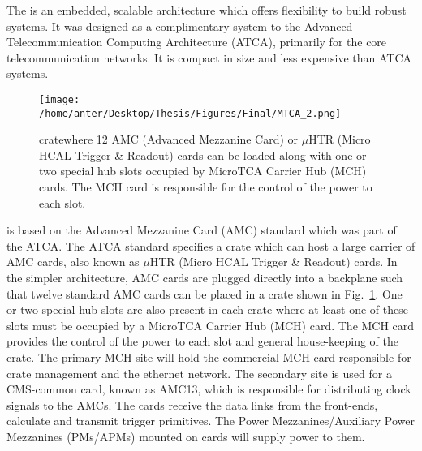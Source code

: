 The \mtca is an embedded, scalable architecture which offers flexibility to build robust systems. It was designed as a complimentary system to the Advanced Telecommunication Computing Architecture (ATCA), primarily for the core telecommunication networks. It is compact in size and less expensive than ATCA systems.\begin{figure}[!h]
\begin{center}
\vspace*{3mm}
\hspace*{-5mm}
\texttt{[image: /home/anter/Desktop/Thesis/Figures/Final/MTCA\_2.png]}\\
\vspace*{4mm}
\caption[\mtca crate showing the different slots.]{\mtca crate\footnotemark where 12 AMC (Advanced Mezzanine Card) or $\mu$HTR (Micro HCAL Trigger \& Readout) cards can be loaded along with one or two special hub slots occupied by MicroTCA Carrier Hub (MCH) cards. The MCH card is responsible for the control of the power to each slot.}
\label{fig:MTCA}
\end{center}
\end{figure} \mtca is based on the Advanced Mezzanine Card (AMC) standard which was part of the ATCA. The ATCA standard specifies a crate which can host a large carrier of AMC cards, also known as $\mu$HTR (Micro HCAL Trigger \& Readout) cards. In the simpler \mtca architecture, AMC cards are plugged directly into a backplane such that twelve standard AMC cards can be placed in a crate shown in Fig.~\ref{fig:MTCA}. One or two special hub slots are also present in each crate where at least one of these slots must be occupied by a MicroTCA Carrier Hub (MCH) card. The MCH card provides the control of the power to each slot and general house-keeping of the crate. The primary MCH site will hold the commercial MCH card responsible for crate management and the ethernet network. The secondary site is used for a CMS-common card, known as AMC13, which is responsible for distributing clock signals to the AMCs. The \mhtr cards receive the data links from the front-ends, calculate and transmit trigger primitives. The Power Mezzanines/Auxiliary Power Mezzanines (PMs/APMs) mounted on \mhtr cards will supply power to them. 

